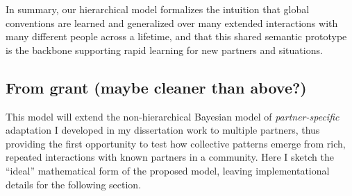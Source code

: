 In summary, our hierarchical model formalizes the intuition that global conventions are learned and generalized over many extended interactions with many different people across a lifetime, and that this shared semantic prototype is the backbone supporting rapid learning for new partners and situations. 

\subsection{From grant (maybe cleaner than above?)}
This model will extend the non-hierarchical Bayesian model of \emph{partner-specific} adaptation I developed in my dissertation work  to multiple partners, thus providing the first opportunity to test how collective patterns emerge from rich, repeated interactions with known partners in a community. 
Here I sketch the ``ideal'' mathematical form of the proposed model, leaving implementational details for the following section.

